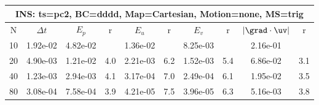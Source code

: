 
\begin{tabular}{|c|c|c|c|c|c|c|c|c|c|} \hline
 \multicolumn{10}{|c|}{INS: ts=pc2, BC=dddd, Map=Cartesian, Motion=none, MS=trig } \\ \hline 
     N  &   $\Delta t$ & $E_p$   &  r  &   $E_u$   &   r    &   $E_v$   & r   &  $|\grad\cdot\uv|$  & r   \\ \hline 
  10   &  1.92e-02  &   4.82e-02  &        &   1.36e-02  &        &   8.25e-03  &        &   2.16e-01  &        \\ 
  20   &  4.90e-03  &   1.21e-02  & 4.0  &   2.21e-03  & 6.2  &   1.52e-03  & 5.4  &   6.86e-02  & 3.1  \\ 
  40   &  1.23e-03  &   2.94e-03  & 4.1  &   3.17e-04  & 7.0  &   2.49e-04  & 6.1  &   1.95e-02  & 3.5  \\ 
  80   &  3.08e-04  &   7.58e-04  & 3.9  &   4.21e-05  & 7.5  &   3.96e-05  & 6.3  &   5.16e-03  & 3.8  \\ 
 \hline 
\end{tabular}
